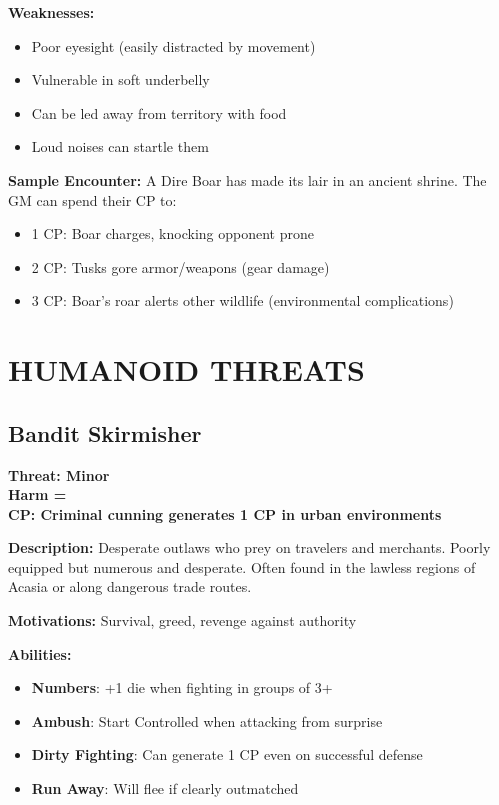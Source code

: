 \documentclass[12pt]{article}
\newcommand{\cp}[1]{\textbf{CP: #1}}
\newcommand{\harm}[1]{\textbf{Harm #1}}
\newcommand{\threat}[1]{\textbf{Threat: #1}}
\begin{document}
\textbf{Weaknesses:}
\begin{itemize}
\item Poor eyesight (easily distracted by movement)
\item Vulnerable in soft underbelly
\item Can be led away from territory with food
\item Loud noises can startle them
\end{itemize}

\textbf{Sample Encounter:}
A Dire Boar has made its lair in an ancient shrine. The GM can spend their CP to:
\begin{itemize}
\item 1 CP: Boar charges, knocking opponent prone
\item 2 CP: Tusks gore armor/weapons (gear damage)
\item 3 CP: Boar's roar alerts other wildlife (environmental complications)
\end{itemize}

\section{HUMANOID THREATS}

\subsection*{Bandit Skirmisher}

\threat{Minor} \\
\harm{=} \\
\cp{Criminal cunning generates 1 CP in urban environments}

\vspace{0.5em}
\textbf{Description:} Desperate outlaws who prey on travelers and merchants. Poorly equipped but numerous and desperate. Often found in the lawless regions of Acasia or along dangerous trade routes.

\textbf{Motivations:} Survival, greed, revenge against authority

\textbf{Abilities:}
\begin{itemize}
\item \textbf{Numbers}: +1 die when fighting in groups of 3+
\item \textbf{Ambush}: Start Controlled when attacking from surprise
\item \textbf{Dirty Fighting}: Can generate 1 CP even on successful defense
\item \textbf{Run Away}: Will flee if clearly outmatched
\end{itemize}
\end{document}
